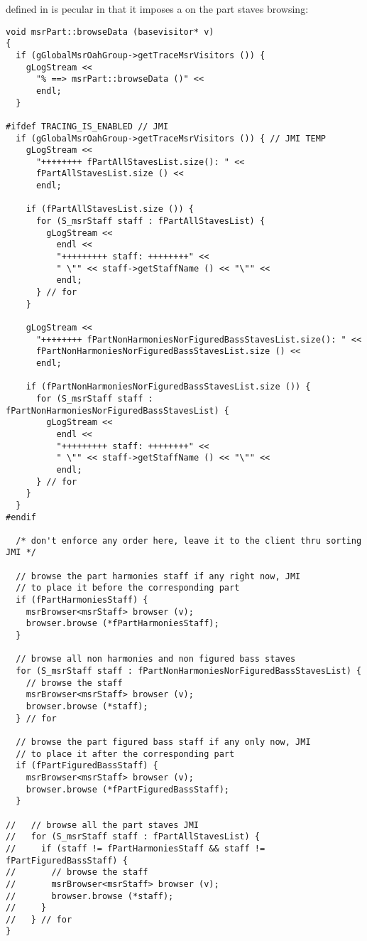  defined in  is pecular in that it imposes a  on the part staves browsing: %
\begin{lstlisting}[language=CPlusPlus]
void msrPart::browseData (basevisitor* v)
{
  if (gGlobalMsrOahGroup->getTraceMsrVisitors ()) {
    gLogStream <<
      "% ==> msrPart::browseData ()" <<
      endl;
  }

#ifdef TRACING_IS_ENABLED // JMI
  if (gGlobalMsrOahGroup->getTraceMsrVisitors ()) { // JMI TEMP
    gLogStream <<
      "++++++++ fPartAllStavesList.size(): " <<
      fPartAllStavesList.size () <<
      endl;

    if (fPartAllStavesList.size ()) {
      for (S_msrStaff staff : fPartAllStavesList) {
        gLogStream <<
          endl <<
          "+++++++++ staff: ++++++++" <<
          " \"" << staff->getStaffName () << "\"" <<
          endl;
      } // for
    }

    gLogStream <<
      "++++++++ fPartNonHarmoniesNorFiguredBassStavesList.size(): " <<
      fPartNonHarmoniesNorFiguredBassStavesList.size () <<
      endl;

    if (fPartNonHarmoniesNorFiguredBassStavesList.size ()) {
      for (S_msrStaff staff : fPartNonHarmoniesNorFiguredBassStavesList) {
        gLogStream <<
          endl <<
          "+++++++++ staff: ++++++++" <<
          " \"" << staff->getStaffName () << "\"" <<
          endl;
      } // for
    }
  }
#endif

  /* don't enforce any order here, leave it to the client thru sorting JMI */

  // browse the part harmonies staff if any right now, JMI
  // to place it before the corresponding part
  if (fPartHarmoniesStaff) {
    msrBrowser<msrStaff> browser (v);
    browser.browse (*fPartHarmoniesStaff);
  }

  // browse all non harmonies and non figured bass staves
  for (S_msrStaff staff : fPartNonHarmoniesNorFiguredBassStavesList) {
    // browse the staff
    msrBrowser<msrStaff> browser (v);
    browser.browse (*staff);
  } // for

  // browse the part figured bass staff if any only now, JMI
  // to place it after the corresponding part
  if (fPartFiguredBassStaff) {
    msrBrowser<msrStaff> browser (v);
    browser.browse (*fPartFiguredBassStaff);
  }

//   // browse all the part staves JMI
//   for (S_msrStaff staff : fPartAllStavesList) {
//     if (staff != fPartHarmoniesStaff && staff != fPartFiguredBassStaff) {
//       // browse the staff
//       msrBrowser<msrStaff> browser (v);
//       browser.browse (*staff);
//     }
//   } // for
}
\end{lstlisting}


